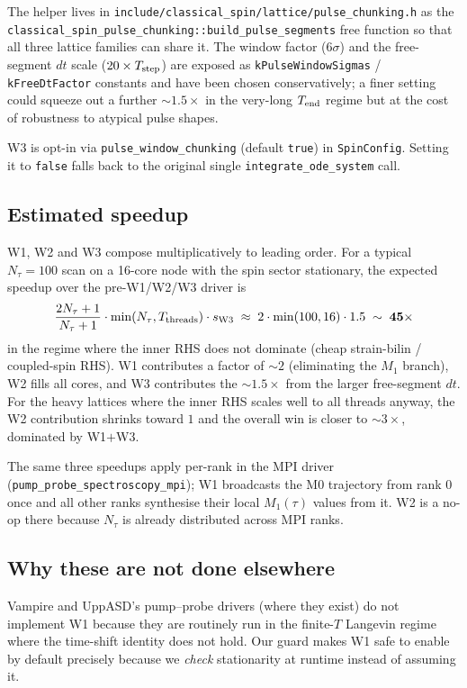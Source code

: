\documentclass[11pt,letterpaper]{article}
\begin{document}
The helper lives in \texttt{include/classical\_spin/lattice/pulse\_chunking.h}
as the \texttt{classical\_spin\_pulse\_chunking::build\_pulse\_segments}
free function so that all three lattice families can share it.
The window factor ($6\sigma$) and the free-segment $dt$ scale ($20
\times T_{\rm step}$) are exposed as
\texttt{kPulseWindowSigmas} / \texttt{kFreeDtFactor} constants and
have been chosen conservatively; a finer setting could squeeze out
a further $\sim 1.5 \times$ in the very-long $T_{\rm end}$ regime
but at the cost of robustness to atypical pulse shapes.

W3 is opt-in via \texttt{pulse\_window\_chunking} (default
\texttt{true}) in \texttt{SpinConfig}.  Setting it to \texttt{false}
falls back to the original single \texttt{integrate\_ode\_system}
call.

\subsection{Estimated speedup}

W1, W2 and W3 compose multiplicatively to leading order.  For a
typical $N_\tau = 100$ scan on a 16-core node with the spin
sector stationary, the expected speedup over the pre-W1/W2/W3
driver is
\[
\frac{2 N_\tau + 1}{N_\tau + 1} \cdot \min(N_\tau, T_{\rm threads})
\cdot s_{\rm W3}
\;\approx\;
2 \cdot \min(100, 16) \cdot 1.5
\;\sim\;
\mathbf{45 \times}
\]
in the regime where the inner RHS does not dominate (cheap
strain-bilin / coupled-spin RHS).  W1 contributes a factor of
$\sim 2$ (eliminating the $M_1$ branch), W2 fills all cores, and
W3 contributes the $\sim 1.5\times$ from the larger free-segment
$dt$.  For the heavy lattices where the inner RHS scales well to
all threads anyway, the W2 contribution shrinks toward $1$ and the
overall win is closer to $\sim 3 \times$, dominated by W1$+$W3.

The same three speedups apply per-rank in the MPI driver
(\texttt{pump\_probe\_spectroscopy\_mpi}); W1 broadcasts the M0
trajectory from rank 0 once and all other ranks synthesise their
local $M_1(\tau)$ values from it.  W2 is a no-op there because
$N_\tau$ is already distributed across MPI ranks.

\subsection{Why these are not done elsewhere}

Vampire and UppASD's pump--probe drivers (where they exist) do not
implement W1 because they are routinely run in the finite-$T$
Langevin regime where the time-shift identity does not hold.  Our
guard makes W1 safe to enable by default precisely because we
\emph{check} stationarity at runtime instead of assuming it.
\end{document}
